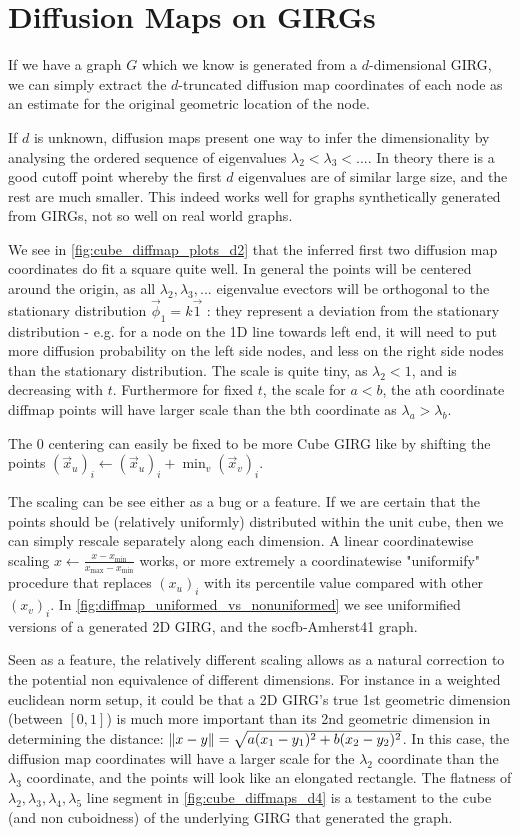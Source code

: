 \section{Diffusion Maps on GIRGs}
If we have a graph $G$ which we know is generated from a $d$-dimensional GIRG, we can simply extract the $d$-truncated diffusion map coordinates of each node as an estimate for the original geometric location of the node.

If $d$ is unknown, diffusion maps present one way to infer the dimensionality by analysing the ordered sequence of eigenvalues $\lambda_2 < \lambda_3 < ...$. In theory there is a good cutoff point whereby the first $d$ eigenvalues are of similar large size, and the rest are much smaller. This indeed works well for graphs synthetically generated from GIRGs, not so well on real world graphs.


We see in \cref{fig:cube_diffmap_plots_d2} that the inferred first two diffusion map coordinates do fit a square quite well. In general the points will be centered around the origin, as all $\lambda_2, \lambda_3, ...$ eigenvalue evectors will be orthogonal to the stationary distribution $\vec{\phi}_1 = k \vec{1}$ : they represent a deviation from the stationary distribution - e.g. for a node on the 1D line towards left end, it will need to put more diffusion probability on the left side nodes, and less on the right side nodes than the stationary distribution. The scale is quite tiny, as $\lambda_2 < 1$, and is decreasing with $t$. Furthermore for fixed $t$, the scale for $a < b$, the ath coordinate diffmap points will have larger scale than the bth coordinate as $\lambda_a > \lambda_b$.

The 0 centering can easily be fixed to be more Cube GIRG like by shifting the points $(\vec{x}_u)_i \gets (\vec{x}_u)_i + \min_v (\vec{x}_v)_i$.

The scaling can be see either as a bug or a feature. If we are certain that the points should be (relatively uniformly) distributed within the unit cube, then we can simply rescale separately along each dimension.
A linear coordinatewise scaling $x \gets \frac{x - x_{\min}}{x_{\max} - x_{\min}}$ works, or more extremely a coordinatewise "uniformify" procedure that replaces $(x_u)_i$ with its percentile value compared with other $(x_v)_i$.
In \cref{fig:diffmap_uniformed_vs_nonuniformed} we see uniformified versions of a generated 2D GIRG, and the socfb-Amherst41 graph.

Seen as a feature, the relatively different scaling allows as a natural correction to the potential non equivalence of different dimensions. For instance in a weighted euclidean norm setup, it could be that a 2D GIRG's true 1st geometric dimension (between $[0, 1]$) is much more important than its 2nd geometric dimension in determining the distance: $\left\lVert x - y\right\rVert = \sqrt{a (x_1 - y_1)^2 + b(x_2 - y_2)^2}$. In this case, the diffusion map coordinates will have a larger scale for the $\lambda_2$ coordinate than the $\lambda_3$ coordinate, and the points will look like an elongated rectangle. The flatness of $\lambda_2, \lambda_3, \lambda_4, \lambda_5$ line segment in \cref{fig:cube_diffmaps_d4} is a testament to the cube (and non cuboidness) of the underlying GIRG that generated the graph. 


